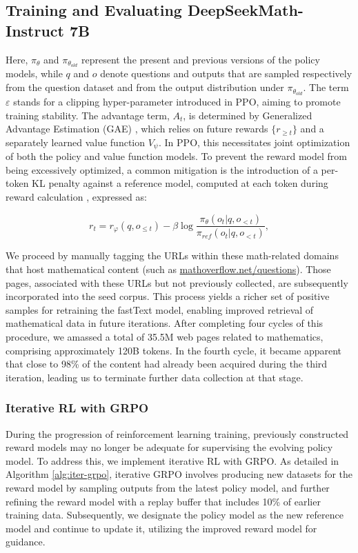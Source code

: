\subsection{Training and Evaluating DeepSeekMath-Instruct 7B}

Here, $\pi_{\theta}$ and $\pi_{\theta_{old}}$ represent the present and previous versions of the policy models, while $q$ and $o$ denote questions and outputs that are sampled respectively from the question dataset and from the output distribution under $\pi_{\theta_{old}}$. The term $\varepsilon$ stands for a clipping hyper-parameter introduced in PPO, aiming to promote training stability. The advantage term, $A_t$, is determined by Generalized Advantage Estimation (GAE) \citep{gae}, which relies on future rewards $\{r_{\ge t}\}$ and a separately learned value function $V_{\psi}$. In PPO, this necessitates joint optimization of both the policy and value function models. To prevent the reward model from being excessively optimized, a common mitigation is the introduction of a per-token KL penalty against a reference model, computed at each token during reward calculation \citep{ouyang2022training}, expressed as:

\begin{equation}
    r_{t} = r_\varphi(q, o_{\le t}) - \beta \log\frac{\pi_{\theta}(o_{t}|q, o_{<t})}{\pi_{ref}(o_{t}|q, o_{<t})},
\label{eq:PPO-reward}
\end{equation}

We proceed by manually tagging the URLs within these math-related domains that host mathematical content (such as \url{mathoverflow.net/questions}). Those pages, associated with these URLs but not previously collected, are subsequently incorporated into the seed corpus. This process yields a richer set of positive samples for retraining the fastText model, enabling improved retrieval of mathematical data in future iterations. After completing four cycles of this procedure, we amassed a total of 35.5M web pages related to mathematics, comprising approximately 120B tokens. In the fourth cycle, it became apparent that close to 98\% of the content had already been acquired during the third iteration, leading us to terminate further data collection at that stage.

\subsubsection{Iterative RL with GRPO} During the progression of reinforcement learning training, previously constructed reward models may no longer be adequate for supervising the evolving policy model. To address this, we implement iterative RL with GRPO. As detailed in Algorithm \ref{alg:iter-grpo}, iterative GRPO involves producing new datasets for the reward model by sampling outputs from the latest policy model, and further refining the reward model with a replay buffer that includes 10\% of earlier training data. Subsequently, we designate the policy model as the new reference model and continue to update it, utilizing the improved reward model for guidance.

